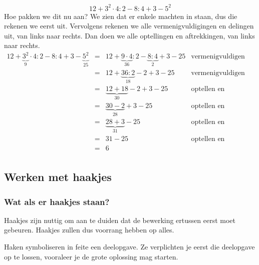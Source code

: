 \begin{voorbeeld}
	\begin{equation*}
	12+3^2 \cdot 4 : 2 - 8 : 4 + 3 - 5^2
	\end{equation*}
	Hoe pakken we dit nu aan? We zien dat er enkele machten in staan, dus die rekenen we eerst uit. Vervolgens rekenen we alle vermenigvuldigingen en delingen uit, van links naar rechts. Dan doen we alle optellingen en aftrekkingen, van links naar rechts.
	\begin{equation*}
	\begin{array}{lllr}
	12+\underbrace{3^2}_{9} \cdot 4 : 2 - 8 : 4 + 3 - \underbrace{5^2}_{25} &=& 12+ \underbrace{9 \cdot 4}_{36} : 2 - \underbrace{8 : 4}_{2} + 3 - 25 & \text{vermenigvuldigen en delen} \\
	&=& 12+ \underbrace{36 : 2}_{18} - 2 + 3 - 25 & \text{vermenigvuldigen en delen} \\
	&=& \underbrace{12+18} _{30} - 2 + 3 - 25 & \text{optellen en aftrekken} \\
	&=& \underbrace{30 - 2}_{28} + 3 - 25 & \text{optellen en aftrekken} \\
	&=& \underbrace{28+3}_{31} - 25 & \text{optellen en aftrekken} \\
	&=& 31 - 25 & \text{optellen en aftrekken} \\
	&=& 6 &  \\
	\end{array}
	\end{equation*}
\end{voorbeeld}


\subsection{Werken met haakjes}
\subsubsection{Wat als er haakjes staan?}

Haakjes zijn nuttig om aan te duiden dat de bewerking ertussen eerst moet gebeuren. Haakjes zullen dus voorrang hebben op alles.


Haken symboliseren in feite een deelopgave. Ze verplichten je eerst die deelopgave op te lossen, vooraleer je de grote oplossing mag starten.


